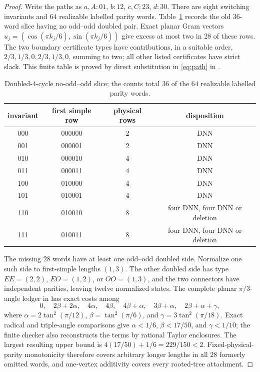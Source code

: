 \documentclass[11pt]{article}
\theoremstyle{remark}
\begin{document}
\begin{proof}
Write the paths as $a,A:01$, $b:12$, $c,C:23$, $d:30$.
There are eight switching invariants and $64$ realizable labelled parity
words.  Table~\ref{tab:dc4} records the old $36$-word slice having no odd--odd
doubled pair.  Exact planar Gram vectors
$u_j=(\cos(\pi k_j/6),\sin(\pi k_j/6))$ give excess at most two in $28$ of
these rows.  The two boundary certificate types have contributions, in a
suitable order, $2/3,1/3,0,2/3,1/3,0$, summing to two; all other listed
certificates have strict slack.  This finite table is proved by direct
substitution in \eqref{eq:path} in \cite{DoubledC4}.

\begin{table}[ht]
\centering\small
\begin{tabular}{cccc}
\toprule
invariant & first simple row & physical rows & disposition\\
\midrule
000&000000&2&DNN\\
001&000001&2&DNN\\
010&000010&4&DNN\\
011&000011&4&DNN\\
100&010000&4&DNN\\
101&010001&4&DNN\\
110&010010&8&four DNN, four DNN or deletion\\
111&010011&8&four DNN, four DNN or deletion\\
\bottomrule
\end{tabular}
\caption{Doubled-$4$-cycle no-odd--odd slice; the counts total $36$ of the
$64$ realizable labelled parity words.}\label{tab:dc4}
\end{table}

The missing $28$ words have at least one odd--odd doubled side.  Normalize one
such side to first-simple lengths $(1,3)$.  The other doubled side has type
$EE=(2,2)$, $EO=(1,2)$, or $OO=(1,3)$, and the two connectors have independent
parities, leaving twelve normalized states.  The complete planar
$\pi/3$-angle ledger in \cite{DoubledC4} has exact costs among
\[
 0,\quad 2\beta+2\alpha,\quad4\alpha,\quad4\beta,
 \quad4\beta+\alpha,\quad3\beta+\alpha,
 \quad2\beta+\alpha+\gamma,
\]
where $\alpha=2\tan^2(\pi/12)$, $\beta=\tan^2(\pi/6)$, and
$\gamma=3\tan^2(\pi/18)$.  Exact radical and triple-angle comparisons give
$\alpha<1/6$, $\beta<17/50$, and $\gamma<1/10$; the finite checker also
reconstructs the terms by rational Taylor enclosures.  The largest resulting
upper bound is $4(17/50)+1/6=229/150<2$.  Fixed-physical-parity monotonicity
therefore covers arbitrary longer lengths in all $28$ formerly omitted words,
and one-vertex additivity covers every rooted-tree attachment.


\end{proof}
\end{document}
